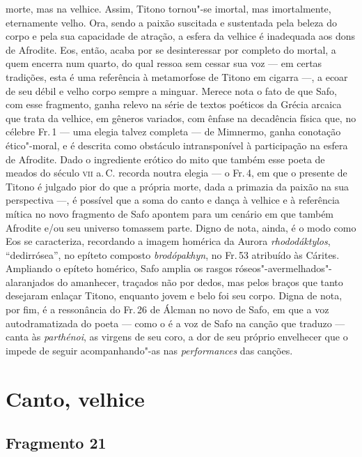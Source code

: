 {morte, mas na velhice. Assim, Titono tornou"-se imortal, mas imortalmente,
eternamente velho. Ora, sendo a paixão suscitada e sustentada pela
beleza do corpo e pela sua capacidade de atração, a esfera da velhice é
inadequada aos dons de Afrodite. Eos, então, acaba por se desinteressar por
completo do mortal, a quem encerra num quarto, do qual ressoa sem cessar sua
voz --- em certas tradições, esta é uma referência à metamorfose de Titono em
cigarra ---, a ecoar de seu débil e velho corpo sempre a minguar. Merece nota o fato de
que Safo, com esse fragmento, ganha relevo na série de textos poéticos da
Grécia arcaica que trata da velhice, em gêneros variados, com ênfase na
decadência física que, no célebre Fr.\,1 --- uma elegia talvez completa --- de
Mimnermo, ganha conotação ético"-moral, e é descrita como obstáculo
intransponível à participação na esfera de Afrodite.
Dado o ingrediente erótico do mito que também esse poeta de meados do século
\textsc{vii} a.\,C. recorda noutra elegia --- o Fr.\,4, em que o presente de Titono é
julgado pior do que a própria morte, dada a primazia da paixão na sua perspectiva
---, é possível que a soma do canto e dança à
velhice e à referência mítica no novo fragmento de Safo apontem para um cenário
em que também Afrodite e/ou seu universo tomassem parte. Digno de nota, ainda,
é o modo como Eos se caracteriza, recordando a imagem homérica da Aurora
\emph{rhododáktylos}, ``dedirrósea'', no
epíteto composto \emph{brodópakhyn}, no Fr.\,53 atribuído às Cárites.
Ampliando o epíteto homérico, Safo amplia os rasgos
róseos"-avermelhados"-alaranjados do amanhecer, traçados não por dedos, mas pelos
braços que tanto desejaram enlaçar Titono, enquanto jovem e belo foi seu
corpo. Digna de nota, por fim, é a ressonância do Fr.\,26 de Álcman no novo de Safo, em que a voz autodramatizada do poeta --- como o é a voz de Safo na canção que traduzo --- canta às \emph{parthénoi}, as virgens de seu coro, a dor de seu próprio envelhecer que o impede de seguir acompanhando"-as nas \emph{performances} das canções.}


\chapter[Canto, velhice: um convite]{Canto, velhice}

\section{Fragmento 21}

